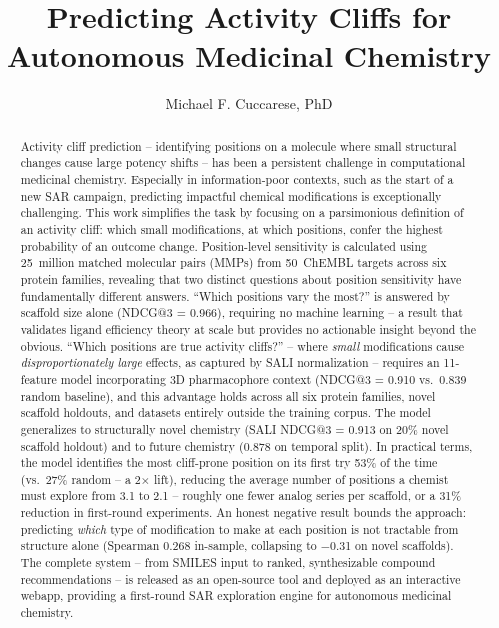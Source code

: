 \documentclass[sigconf, nonacm]{acmart}
\begin{document}
\title{Predicting Activity Cliffs for Autonomous Medicinal Chemistry}

\author{Michael F. Cuccarese, PhD}
\affiliation{%
  \country{}}
\email{}

\begin{abstract}
Activity cliff prediction -- identifying positions on a molecule where small structural changes cause large potency shifts -- has been a persistent challenge in computational medicinal chemistry. Especially in information-poor contexts, such as the start of a new SAR campaign, predicting impactful chemical modifications is exceptionally challenging. This work simplifies the task by focusing on a parsimonious definition of an activity cliff: which small modifications, at which positions, confer the highest probability of an outcome change. Position-level sensitivity is calculated using 25~million matched molecular pairs (MMPs) from 50~ChEMBL targets across six protein families, revealing that two distinct questions about position sensitivity have fundamentally different answers. ``Which positions vary the most?'' is answered by scaffold size alone (NDCG@3 = 0.966), requiring no machine learning -- a result that validates ligand efficiency theory at scale but provides no actionable insight beyond the obvious. ``Which positions are true activity cliffs?'' -- where \textit{small} modifications cause \textit{disproportionately large} effects, as captured by SALI normalization -- requires an 11-feature model incorporating 3D pharmacophore context (NDCG@3 = 0.910 vs.\ 0.839 random baseline), and this advantage holds across all six protein families, novel scaffold holdouts, and datasets entirely outside the training corpus. The model generalizes to structurally novel chemistry (SALI NDCG@3 = 0.913 on 20\% novel scaffold holdout) and to future chemistry (0.878 on temporal split). In practical terms, the model identifies the most cliff-prone position on its first try 53\% of the time (vs.\ 27\% random -- a 2$\times$ lift), reducing the average number of positions a chemist must explore from 3.1 to 2.1 -- roughly one fewer analog series per scaffold, or a 31\% reduction in first-round experiments. An honest negative result bounds the approach: predicting \textit{which} type of modification to make at each position is not tractable from structure alone (Spearman 0.268 in-sample, collapsing to $-$0.31 on novel scaffolds). The complete system -- from SMILES input to ranked, synthesizable compound recommendations -- is released as an open-source tool and deployed as an interactive webapp, providing a first-round SAR exploration engine for autonomous medicinal chemistry.
\end{abstract}
\end{document}
